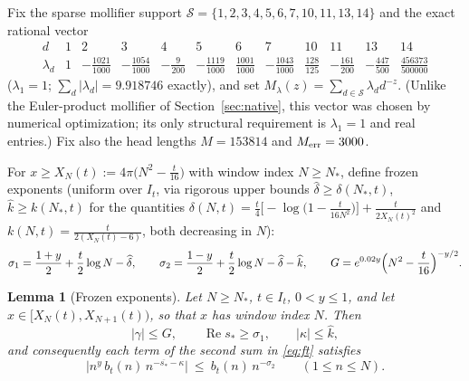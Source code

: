 \documentclass[11pt]{article}
\newtheorem{lemma}[theorem]{Lemma}
\theoremstyle{definition}
\newcommand{\calS}{\mathcal{S}}
\DeclareMathOperator{\Rea}{Re}
\begin{document}
Fix the sparse mollifier support
$\calS=\{1,2,3,4,5,6,7,10,11,13,14\}$ and the exact rational vector
\[
\begin{array}{c|ccccccccccc}
d&1&2&3&4&5&6&7&10&11&13&14\\ \hline
\lambda_d&
1&-\frac{1021}{1000}&-\frac{1054}{1000}&-\frac{9}{200}&
-\frac{1119}{1000}&\frac{1001}{1000}&-\frac{1043}{1000}&
\frac{128}{125}&-\frac{161}{200}&-\frac{447}{500}&\frac{456373}{500000}
\end{array}
\]
($\lambda_1=1$; $\sum_d|\lambda_d|=9.918746$ exactly), and set
$M_\lambda(z)=\sum_{d\in\calS}\lambda_d d^{-z}$. (Unlike the Euler-product
mollifier of Section~\ref{sec:native}, this vector was chosen by numerical optimization;
its only structural requirement is $\lambda_1=1$ and real entries.)
Fix also the head lengths $M=153814$ and $M_{\rm err}=3000$.

For $x\ge X_N(t):=4\pi\bigl(N^2-\frac t{16}\bigr)$ with window index
$N\ge N_*$, define frozen exponents (uniform over $I_t$, via rigorous
upper bounds $\widehat\delta\ge\delta(N_*,t)$,
$\widehat k\ge k(N_*,t)$ for the quantities
$\delta(N,t)=\frac t4\bigl[-\log\bigl(1-\frac t{16N^2}\bigr)\bigr]
+\frac{t}{2X_N(t)^2}$ and $k(N,t)=\frac{t}{2(X_N(t)-6)}$, both
decreasing in $N$):
\[
\sigma_1=\frac{1+y}{2}+\frac t2\log N-\widehat\delta,
\qquad
\sigma_2=\frac{1-y}{2}+\frac t2\log N-\widehat\delta-\widehat k,
\qquad
G=e^{0.02y}\Bigl(N^2-\frac t{16}\Bigr)^{-y/2}.
\]
\begin{lemma}[Frozen exponents]\label{lem:frozen}
Let $N\ge N_*$, $t\in I_t$, $0<y\le1$, and let
$x\in[X_N(t),X_{N+1}(t))$, so that $x$ has window index $N$. Then
\[
|\gamma|\le G,\qquad
\Rea s_*\ge\sigma_1,\qquad
|\kappa|\le\widehat k,
\]
and consequently each term of the second sum in \eqref{eq:ft}
satisfies
\[
\bigl|n^y\,b_t(n)\,n^{-\overline{s_*}-\kappa}\bigr|
\ \le\ b_t(n)\,n^{-\sigma_2}
\qquad(1\le n\le N).
\]
\end{lemma}
\end{document}
